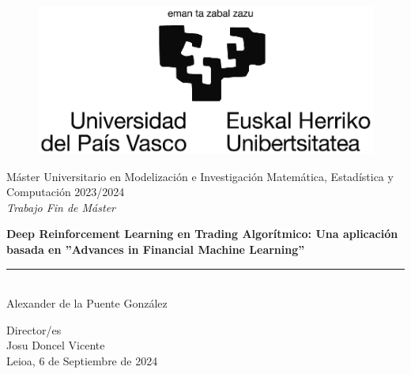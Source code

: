 \documentclass[a4paper,12pt, twoside]{report}
\begin{document}
\begin{titlepage}
\begin{sffamily}
\color{NavyBlue}
\begin{center}
\begin{figure}[htb]
\begin{center}
\vspace*{0.6cm}
\includegraphics[width=15cm]{figures/logoEHU_blanco_mediano.eps}
\vspace*{1.6cm}
\end{center}
\end{figure}
\begin{LARGE}
Máster Universitario en Modelización e Investigación Matemática, Estadística y Computación 
2023/2024 \\%
\vspace*{1cm}
\textsl{Trabajo Fin de Máster}\\
\end{LARGE}
\Huge{\textbf{Deep Reinforcement Learning en Trading Algorítmico: Una aplicación basada en ''Advances in Financial Machine Learning''}} %
\vspace*{1cm}
\rule{80mm}{0.1mm}\\
\huge{Alexander de la Puente González}\\ %
\vspace*{0.5cm}
\begin{Large}
Director/es\\
Josu Doncel Vicente\\
Leioa, 6 de Septiembre de 2024\\
\end{Large}
\end{center}
\end{sffamily}
\end{titlepage}
\end{document}
